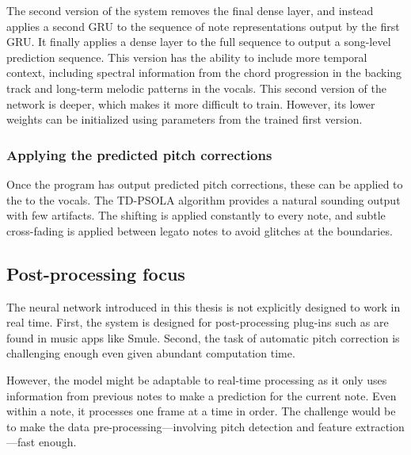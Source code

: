 The second version of the system removes the final dense layer, and instead applies a second GRU to the sequence of note representations output by the first GRU. It finally applies a dense layer to the full sequence to output a song-level prediction sequence. This version has the ability to include more temporal context, including spectral information from the chord progression in the backing track and long-term melodic patterns in the vocals. This second version of the network is deeper, which makes it more difficult to train. However, its lower weights can be initialized using parameters from the trained first version.

\subsubsection{Applying the predicted pitch corrections}
Once the program has output predicted pitch corrections, these can be applied to the to the vocals. The TD-PSOLA algorithm provides a natural sounding output with few artifacts. The shifting is applied constantly to every note, and subtle cross-fading is applied between legato notes to avoid glitches at the boundaries.

\subsection{Post-processing focus}
The neural network introduced in this thesis is not explicitly designed to work in real time. First, the system is designed for post-processing plug-ins such as are found in music apps like Smule. Second, the task of automatic pitch correction is challenging enough even given abundant computation time. 

However, the model might be adaptable to real-time processing as it only uses information from previous notes to make a prediction for the current note. Even within a note, it processes one frame at a time in order. The challenge would be to make the data pre-processing---involving pitch detection and feature extraction---fast enough. 

